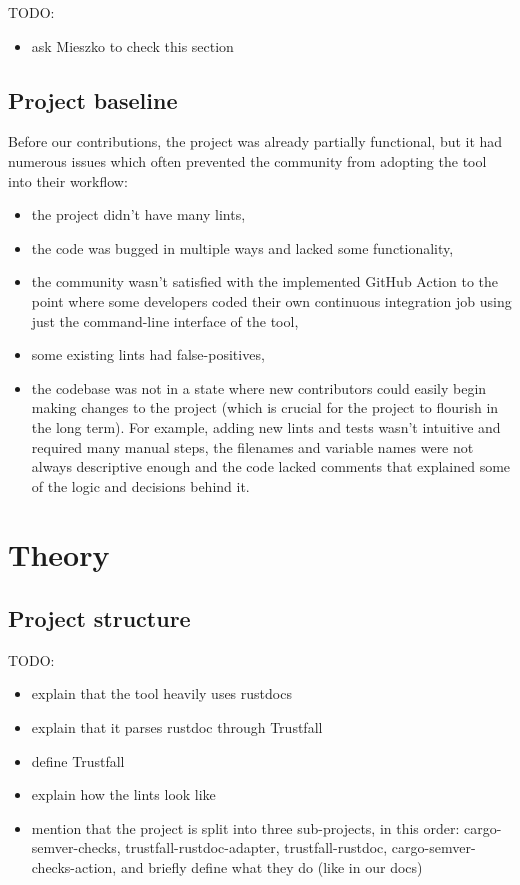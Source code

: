 \documentclass[licencjacka,en]{pracamgr}
\begin{document}
TODO:
\begin{itemize}
	\item ask Mieszko to check this section
\end{itemize}

\section{Project baseline}

Before our contributions, the project was already partially functional,
but it had numerous issues which often prevented the community from adopting the tool
into their workflow:
\begin{itemize}
	\item the project didn't have many lints,
	\item the code was bugged in multiple ways and lacked some functionality,
	\item the community wasn't satisfied with the implemented GitHub Action to the point where
		some developers coded their own continuous integration job using just the command-line interface of the tool,
	\item some existing lints had false-positives,
	\item the codebase was not in a state where new contributors could easily begin making changes
		to the project (which is crucial for the project to flourish in the long term).
		For example, adding new lints and tests wasn't intuitive and required many manual steps,
		the filenames and variable names were not always descriptive enough
		and the code lacked comments that explained some of the logic and decisions behind it.
\end{itemize}


\chapter{Theory}\label{r:chapter_theory}

\section{Project structure}\label{r:section_projectstructure}

TODO:
\begin{itemize}
	\item explain that the tool heavily uses rustdocs
	\item explain that it parses rustdoc through Trustfall
	\item define Trustfall
	\item explain how the lints look like
	\item mention that the project is split into three sub-projects,
		in this order: cargo-semver-checks, trustfall-rustdoc-adapter, trustfall-rustdoc,
		cargo-semver-checks-action,
		and briefly define what they do (like in our docs)
\end{itemize}
\end{document}
